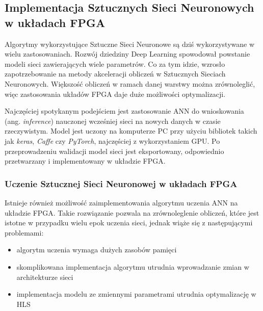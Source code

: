 \subsection{Implementacja Sztucznych Sieci Neuronowych w układach FPGA}

Algorytmy wykorzystujące Sztuczne Sieci Neuronowe są dziś wykorzystywane w wielu zastosowaniach. Rozwój dziedziny Deep 
Learning spowodował powstanie modeli sieci zawierających wiele parametrów. Co za tym idzie, wzrosło zapotrzebowanie na metody 
akceleracji obliczeń w Sztucznych Sieciach Neuronowych. Większość obliczeń w ramach danej warstwy można zrównoleglić, więc 
zastosowania układów FPGA daje duże możliwości optymalizacji.

Najczęściej spotykanym podejściem jest zastosowanie ANN do wnioskowania (ang. \emph{inference}) nauczonej 
wcześniej sieci na nowych danych w czasie rzeczywistym. Model jest uczony na komputerze PC przy użyciu bibliotek takich jak 
\emph{keras}, \emph{Caffe} czy \emph{PyTorch}, najczęściej z wykorzystaniem GPU. Po przeprowadzeniu walidacji model sieci jest eksportowany, odpowiednio przetwarzany i implementowany w układzie FPGA. 



\subsubsection{Uczenie Sztucznej Sieci Neuronowej w układach FPGA}

Istnieje również możliwość zaimplementowania algorytmu uczenia ANN na układzie FPGA. Takie rozwiązanie pozwala na zrównoleglenie obliczeń, które jest istotne w przypadku wielu epok uczenia sieci, jednak wiąże się z następującymi problemami:
\begin{itemize}
    \item algorytm uczenia wymaga dużych zasobów pamięci
    \item skomplikowana implementacja algorytmu utrudnia wprowadzanie zmian w architekturze sieci
    \item implementacja modelu ze zmiennymi parametrami utrudnia optymalizację w HLS
\end{itemize}



